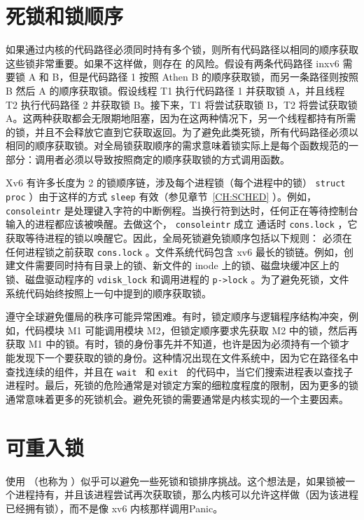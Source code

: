     \section{死锁和锁顺序  }    如果通过内核的代码路径必须同时持有多个锁，则所有代码路径以相同的顺序获取这些锁非常重要。如果不这样做，则存在        的风险。假设有两条代码路径 inxv6 需要锁 A 和 B，但是代码路径 1 按照 Athen B 的顺序获取锁，而另一条路径则按照 B 然后 A 的顺序获取锁。假设线程 T1 执行代码路径 1 并获取锁 A，并且线程 T2 执行代码路径 2 并获取锁 B。接下来，T1 将尝试获取锁 B，T2 将尝试获取锁 A。这两种获取都会无限期地阻塞，因为在这两种情况下，另一个线程都持有所需的锁，并且不会释放它直到它获取返回。为了避免此类死锁，所有代码路径必须以相同的顺序获取锁。对全局锁获取顺序的需求意味着锁实际上是每个函数规范的一部分：调用者必须以导致按照商定的顺序获取锁的方式调用函数。  

Xv6 有许多长度为 2 的锁顺序链，涉及每个进程锁（每个进程中的锁）
    \lstinline{struct proc}    ）由于这样的方式
    \lstinline{sleep}    有效（参见章节~\ref {CH:SCHED}    ）。例如，
    \lstinline{consoleintr}   
        是处理键入字符的中断例程。当换行符到达时，任何正在等待控制台输入的进程都应该被唤醒。去做这个，
    \lstinline{consoleintr}    成立
 通话时    \lstinline{cons.lock}   
        ，它获取等待进程的锁以唤醒它。因此，全局死锁避免锁顺序包括以下规则：
 必须在任何进程锁之前获取    \lstinline{cons.lock}   。文件系统代码包含 xv6 最长的锁链。例如，创建文件需要同时持有目录上的锁、新文件的 inode 上的锁、磁盘块缓冲区上的锁、磁盘驱动程序的    \lstinline{vdisk_lock}    和调用进程的    \lstinline{p->lock}    。为了避免死锁，文件系统代码始终按照上一句中提到的顺序获取锁。  

遵守全球避免僵局的秩序可能异常困难。有时，锁定顺序与逻辑程序结构冲突，例如，代码模块 M1 可能调用模块 M2，但锁定顺序要求先获取 M2 中的锁，然后再获取 M1 中的锁。有时，锁的身份事先并不知道，也许是因为必须持有一个锁才能发现下一个要获取的锁的身份。这种情况出现在文件系统中，因为它在路径名中查找连续的组件，并且在  {    \tt    wait   }  和  {    \tt    exit   }  的代码中，当它们搜索进程表以查找子进程时。最后，死锁的危险通常是对锁定方案的细粒度程度的限制，因为更多的锁通常意味着更多的死锁机会。避免死锁的需要通常是内核实现的一个主要因素。  

   \section{可重入锁  }     

使用       （也称为       ）似乎可以避免一些死锁和锁排序挑战。这个想法是，如果锁被一个进程持有，并且该进程尝试再次获取锁，那么内核可以允许这样做（因为该进程已经拥有锁），而不是像 xv6 内核那样调用Panic。  

